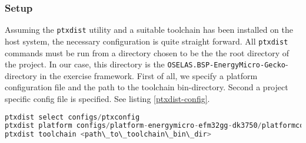 \subsubsection{Setup}

Assuming the \texttt{ptxdist} utility and a suitable toolchain has been installed on the host system, the necessary configuration is quite straight forward. All \texttt{ptxdist} commands must be run from a directory chosen to be the the root directory of the project. In our case, this directory is the \texttt{OSELAS.BSP-EnergyMicro-Gecko}-directory in the exercise framework. First of all, we specify a platform configuration file and the path to the toolchain bin-directory. Second a project specific config file is specified. See listing \ref{ptxdist-config}.

\begin{lstlisting}[language=C, label=ptxdist-config, caption=Config]
ptxdist select configs/ptxconfig
ptxdist platform configs/platform-energymicro-efm32gg-dk3750/platformconfig
ptxdist toolchain <path\_to\_toolchain\_bin\_dir>
\end{lstlisting}
